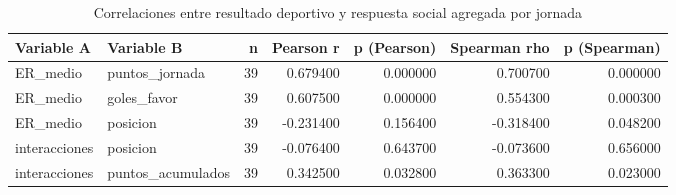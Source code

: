 \begin{table}
\caption{Correlaciones entre resultado deportivo y respuesta social agregada por jornada}
\label{tab:correlaciones_jornada}
\begin{tabular}{llrrrrr}
\toprule
Variable A & Variable B & n & Pearson r & p (Pearson) & Spearman rho & p (Spearman) \\
\midrule
ER\_medio & puntos\_jornada & 39 & 0.679400 & 0.000000 & 0.700700 & 0.000000 \\
ER\_medio & goles\_favor & 39 & 0.607500 & 0.000000 & 0.554300 & 0.000300 \\
ER\_medio & posicion & 39 & -0.231400 & 0.156400 & -0.318400 & 0.048200 \\
interacciones & posicion & 39 & -0.076400 & 0.643700 & -0.073600 & 0.656000 \\
interacciones & puntos\_acumulados & 39 & 0.342500 & 0.032800 & 0.363300 & 0.023000 \\
\bottomrule
\end{tabular}
\end{table}
